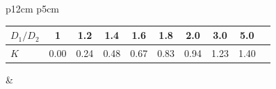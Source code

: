 \begin{minipage}{\textwidth}
	\begin{tabular}[t]{p{12cm} p{5cm}}
		\begin{tabular}{l c c c c c c c c c}
			$D_1/D_2$ & 1 &  1.2 & 	1.4 & 	1.6 & 	1.8 & 	2.0 & 	3.0 & 	5.0\\
			\hline
			$K$  & 0.00 & 	0.24 & 	0.48 & 	0.67 & 	0.83 & 	0.94 & 	1.23 & 	1.40
		\end{tabular}
		&
		\vfill
	\end{tabular}
\end{minipage}
\vspace{1cm}

